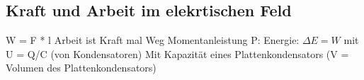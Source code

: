 \subsection*{Kraft und Arbeit im elekrtischen Feld}
    W = F * l Arbeit ist Kraft mal Weg
    Momentanleistung P:
    Energie: $\Delta E = W$
     mit U = Q/C (von Kondensatoren)
    Mit Kapazität eines Plattenkondensators (V = Volumen des Plattenkondensators)
